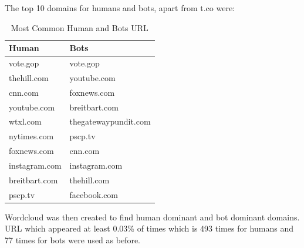 \documentclass[letterpaper]{article}
\begin{document}
The top 10 domains for humans and bots, apart from t.co were:
\begin{table}[H]
    \centering
    \begin{tabular}{|l|l|}
    \hline
    \textbf{Human} & \textbf{Bots} \\ \hline
    vote.gop & vote.gop \\ \hline
    thehill.com & youtube.com \\ \hline
    cnn.com & foxnews.com \\ \hline
    youtube.com & breitbart.com \\ \hline
    wtxl.com & thegatewaypundit.com \\ \hline
    nytimes.com & pscp.tv \\ \hline
    foxnews.com & cnn.com \\ \hline
    instagram.com & instagram.com \\ \hline
    breitbart.com & thehill.com \\ \hline
    pscp.tv & facebook.com \\ \hline
    \end{tabular}
    \caption{Most Common Human and Bots URL}
    \label{tab:common_human_bots}
\end{table}

Wordcloud was then created to find human dominant and bot dominant domains. URL which appeared at least 0.03\% of times which is 493 times for humans 
and 77 times for bots were used as before.
\end{document}
